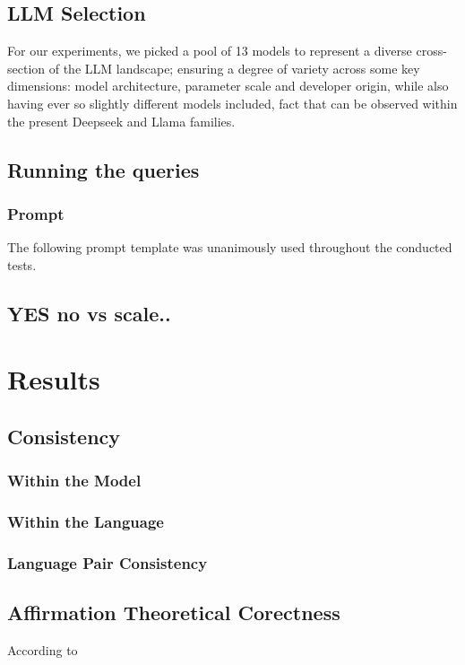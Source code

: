 \documentclass[11pt]{article}
\begin{document}
\subsection{LLM Selection} %
For our experiments, we picked a pool of 13 models to represent a diverse cross-section of the LLM landscape; ensuring a degree of variety across some key dimensions: model architecture, parameter scale and developer origin, while also having ever so slightly different models included, fact that can be observed within the present Deepseek \cite{deepseekai2025} and Llama families.

\subsection{Running the queries}
\subsubsection{Prompt}
The following prompt template was unanimously used throughout the conducted tests.


\subsection{YES no vs scale..}


\section{Results}


\subsection{Consistency}

\subsubsection{Within the Model} 

\subsubsection{Within the Language} 

\subsubsection{Language Pair Consistency}


\subsection{Affirmation Theoretical Corectness} %
According to 
\end{document}
